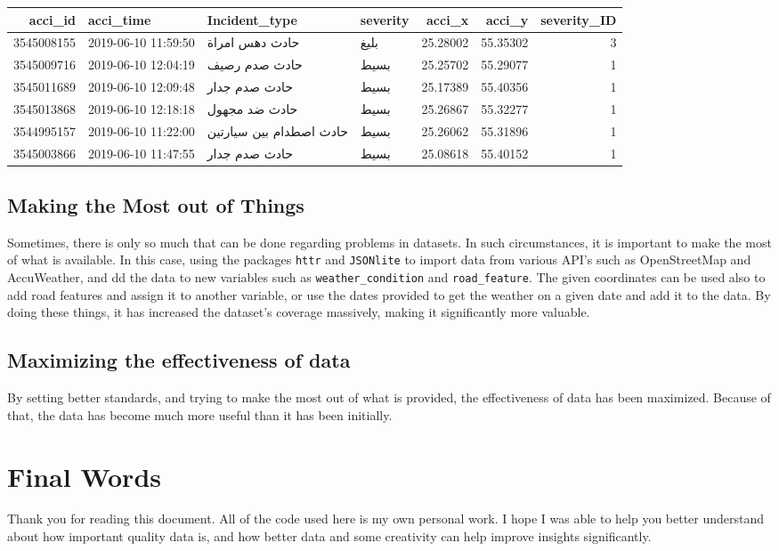 \documentclass[
]{book}
\begin{document}
\begin{tabular}{r|l|l|l|r|r|r}
\hline
acci\_id & acci\_time & Incident\_type & severity & acci\_x & acci\_y & severity\_ID\\
\hline
3545008155 & 2019-06-10 11:59:50 & حادث دهس امراة & بليغ & 25.28002 & 55.35302 & 3\\
\hline
3545009716 & 2019-06-10 12:04:19 & حادث صدم رصيف & بسيط & 25.25702 & 55.29077 & 1\\
\hline
3545011689 & 2019-06-10 12:09:48 & حادث صدم جدار & بسيط & 25.17389 & 55.40356 & 1\\
\hline
3545013868 & 2019-06-10 12:18:18 & حادث ضد مجهول & بسيط & 25.26867 & 55.32277 & 1\\
\hline
3544995157 & 2019-06-10 11:22:00 & حادث اصطدام بين سيارتين & بسيط & 25.26062 & 55.31896 & 1\\
\hline
3545003866 & 2019-06-10 11:47:55 & حادث صدم جدار & بسيط & 25.08618 & 55.40152 & 1\\
\hline
\end{tabular}

\hypertarget{making-the-most-out-of-things}{%
\section{Making the Most out of Things}\label{making-the-most-out-of-things}}

Sometimes, there is only so much that can be done regarding problems in datasets. In such circumstances, it is important to make the most of what is available. In this case, using the packages \texttt{httr} and \texttt{JSONlite} to import data from various API's such as OpenStreetMap and AccuWeather, and dd the data to new variables such as \texttt{weather\_condition} and \texttt{road\_feature}. The given coordinates can be used also to add road features and assign it to another variable, or use the dates provided to get the weather on a given date and add it to the data. By doing these things, it has increased the dataset's coverage massively, making it significantly more valuable.

\hypertarget{maximizing-the-effectiveness-of-data}{%
\section{Maximizing the effectiveness of data}\label{maximizing-the-effectiveness-of-data}}

By setting better standards, and trying to make the most out of what is provided, the effectiveness of data has been maximized. Because of that, the data has become much more useful than it has been initially.

\hypertarget{final-words}{%
\chapter{Final Words}\label{final-words}}

Thank you for reading this document. All of the code used here is my own personal work. I hope I was able to help you better understand about how important quality data is, and how better data and some creativity can help improve insights significantly.

  
\end{document}
